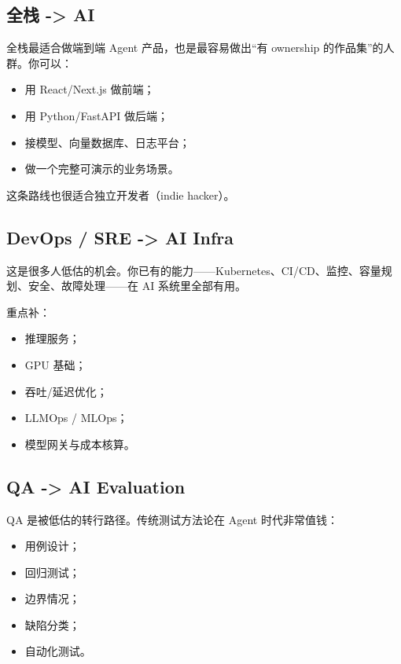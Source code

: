 \subsection{全栈 -> AI}

全栈最适合做端到端 Agent 产品，也是最容易做出``有 ownership 的作品集''的人群。你可以：


\begin{itemize}[leftmargin=2em]
\item 用 React/Next.js 做前端；
\item 用 Python/FastAPI 做后端；
\item 接模型、向量数据库、日志平台；
\item 做一个完整可演示的业务场景。
\end{itemize}

这条路线也很适合独立开发者（indie hacker）。


\subsection{DevOps / SRE -> AI Infra}

这是很多人低估的机会。你已有的能力------Kubernetes、CI/CD、监控、容量规划、安全、故障处理------在 AI 系统里全部有用。


重点补：


\begin{itemize}[leftmargin=2em]
\item 推理服务；
\item GPU 基础；
\item 吞吐/延迟优化；
\item LLMOps / MLOps；
\item 模型网关与成本核算。
\end{itemize}

\subsection{QA -> AI Evaluation}

QA 是被低估的转行路径。传统测试方法论在 Agent 时代非常值钱：


\begin{itemize}[leftmargin=2em]
\item 用例设计；
\item 回归测试；
\item 边界情况；
\item 缺陷分类；
\item 自动化测试。
\end{itemize}


